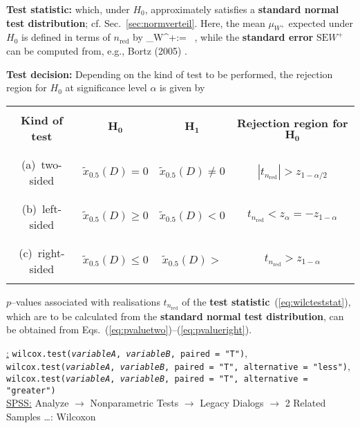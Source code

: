\medskip
\noindent
\textbf{Test statistic:}
%
\be
{}
\ee
%
which, under $H_{0}$, approximately satisfies a \textbf{standard
normal test distribution}; cf. Sec.~\ref{sec:normverteil}. Here,
the mean $\mu_{W^{+}}$ expected under $H_{0}$ is defined in terms
of $n_\mathrm{red}$ by
%
\be
\mu_{W^{+}}:= \ ,
\ee
%
while the \textbf{standard error} $\text{SE}W^{+}$ can be computed 
from, e.g., Bortz (2005) .

\medskip
\noindent
\textbf{Test decision:} Depending on the kind of test to be 
performed, the rejection region for $H_{0}$ at significance level 
$\alpha$ is given by
%
\begin{center}
\begin{tabular}[h]{c|c|c|c}
 & & & \\
\textbf{Kind of test} & $\boldsymbol{H_{0}}$ &
$\boldsymbol{H_{1}}$ &
\textbf{Rejection region for} $\boldsymbol{H_{0}}$ \\
 & & & \\
\hline
 & & & \\
(a)~two-sided & $\tilde{x}_{0.5}(D) = 0$ & $\tilde{x}_{0.5}(D)
\neq 0$ & $|t_{n_\mathrm{red}}|>z_{1-\alpha/2}$ \\
 & & & \\
\hline
 & & & \\
(b)~left-sided & $\tilde{x}_{0.5}(D) \geq 0$ & $\tilde{x}_{0.5}(D)
< 0$ & $t_{n_\mathrm{red}}<z_{\alpha}=-z_{1-\alpha}$ \\
 & & & \\
\hline
 & & & \\
(c)~right-sided & $\tilde{x}_{0.5}(D) \leq 0$ & $\tilde{x}_{0.5}(D)
> $ & $t_{n_\mathrm{red}}>z_{1-\alpha}$ \\
 & & &
\end{tabular}
\end{center}
%
$p$--values associated with realisations $t_{n_\mathrm{red}}$ of 
the \textbf{test statistic}~(\ref{eq:wilcteststat}), which are to
be calculated from the
\textbf{standard normal test distribution}, can be obtained from 
Eqs.~(\ref{eq:pvaluetwo})--(\ref{eq:pvalueright}).

\medskip
\noindent
\underline{\R:}
\texttt{wilcox.test(\textit{variableA}, \textit{variableB},
paired = "T")}, \\
\texttt{wilcox.test(\textit{variableA}, \textit{variableB},
paired = "T", alternative = "less")}, \\
\texttt{wilcox.test(\textit{variableA}, \textit{variableB},
paired = "T", alternative = "greater")} \\
\underline{SPSS:} Analyze $\rightarrow$ Nonparametric Tests
$\rightarrow$ Legacy Dialogs $\rightarrow$ 2 Related
Samples \ldots: Wilcoxon


